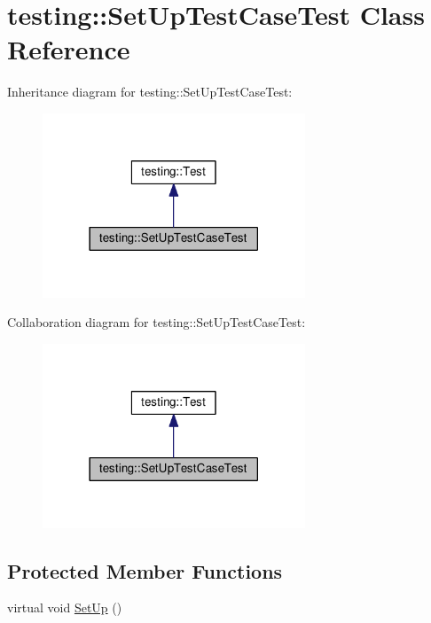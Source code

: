 \hypertarget{classtesting_1_1SetUpTestCaseTest}{}\section{testing\+:\+:Set\+Up\+Test\+Case\+Test Class Reference}
\label{classtesting_1_1SetUpTestCaseTest}


Inheritance diagram for testing\+:\+:Set\+Up\+Test\+Case\+Test\+:
\nopagebreak
\begin{figure}[H]
\begin{center}
\leavevmode
\includegraphics[width=222pt]{classtesting_1_1SetUpTestCaseTest__inherit__graph}
\end{center}
\end{figure}


Collaboration diagram for testing\+:\+:Set\+Up\+Test\+Case\+Test\+:
\nopagebreak
\begin{figure}[H]
\begin{center}
\leavevmode
\includegraphics[width=222pt]{classtesting_1_1SetUpTestCaseTest__coll__graph}
\end{center}
\end{figure}
\subsection*{Protected Member Functions}
\begin{DoxyCompactItemize}
\item 
virtual void \hyperlink{classtesting_1_1SetUpTestCaseTest_a4b44551ccf73e66de7ec95b2ab3b2085}{Set\+Up} ()
\end{DoxyCompactItemize}
